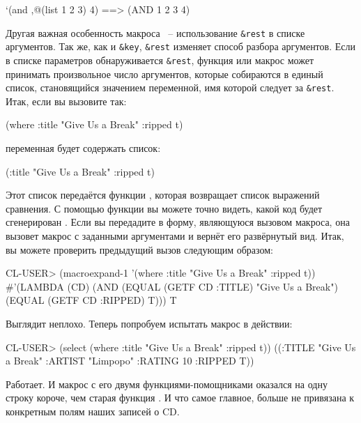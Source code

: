 \begin{myverb}
  `(and ,@(list 1 2 3) 4) ==> (AND 1 2 3 4)
\end{myverb}

Другая важная особенность макроса ~-- использование \lstinline{&rest} в списке
аргументов. Так же, как и \lstinline!&key!, \lstinline{&rest} изменяет способ разбора
аргументов. Если в списке параметров обнаруживается \lstinline{&rest}, функция или макрос может
принимать произвольное число аргументов, которые собираются в единый список, становящийся
значением переменной, имя которой следует за \lstinline{&rest}. Итак, если вы вызовите
 так:

\begin{myverb}
(where :title "Give Us a Break" :ripped t)
\end{myverb}

переменная  будет содержать список:

\begin{myverb}
(:title "Give Us a Break" :ripped t)
\end{myverb}

Этот список передаётся функции , которая возвращает список
выражений сравнения. С помощью функции  вы можете точно видеть,
какой код будет сгенерирован . Если вы передадите в 
форму, являющуюся вызовом макроса, она вызовет макрос с заданными аргументами и вернёт его
развёрнутый вид. Итак, вы можете проверить предыдущий вызов  следующим
образом:

\begin{myverb}
  CL-USER> (macroexpand-1 '(where :title "Give Us a Break" :ripped t))
  #'(LAMBDA (CD)
      (AND (EQUAL (GETF CD :TITLE) "Give Us a Break")
           (EQUAL (GETF CD :RIPPED) T)))
  T
\end{myverb}

Выглядит неплохо. Теперь попробуем испытать макрос в действии:

\begin{myverb}
  CL-USER> (select (where :title "Give Us a Break" :ripped t))
  ((:TITLE "Give Us a Break" :ARTIST "Limpopo" :RATING 10 :RIPPED T))
\end{myverb}

Работает. И макрос  с его двумя функциями-помощниками оказался на одну строку
короче, чем старая функция . И что самое главное,  больше не
привязана к конкретным полям наших записей о CD.

